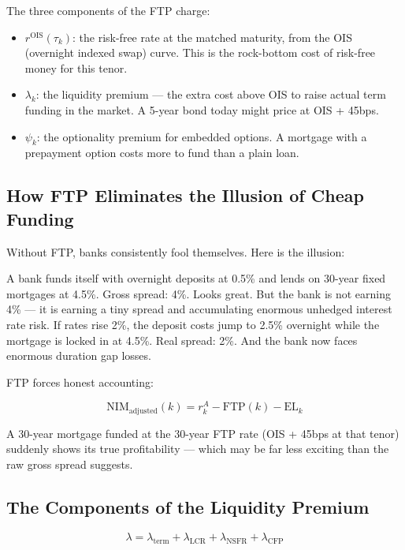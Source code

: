 \documentclass[12pt,a4paper]{article}
\begin{document}
The three components of the FTP charge:
\begin{itemize}[noitemsep]
  \item $r^{\text{OIS}}(\tau_k)$: the risk-free rate at the matched maturity,
        from the OIS (overnight indexed swap) curve.  This is the rock-bottom
        cost of risk-free money for this tenor.
  \item $\lambda_k$: the liquidity premium --- the extra cost above OIS to
        raise actual term funding in the market.  A 5-year bond today might
        price at OIS + 45bps.
  \item $\psi_k$: the optionality premium for embedded options.  A mortgage
        with a prepayment option costs more to fund than a plain loan.
\end{itemize}

\subsection{How FTP Eliminates the Illusion of Cheap Funding}

Without FTP, banks consistently fool themselves.  Here is the illusion:

A bank funds itself with overnight deposits at 0.5\% and lends on 30-year
fixed mortgages at 4.5\%.  Gross spread: 4\%.  Looks great.  But the bank
is not earning 4\% --- it is earning a tiny spread and accumulating enormous
unhedged interest rate risk.  If rates rise 2\%, the deposit costs jump to
2.5\% overnight while the mortgage is locked in at 4.5\%.  Real spread: 2\%.
And the bank now faces enormous duration gap losses.

FTP forces honest accounting:

\begin{equation}
  \text{NIM}_{\text{adjusted}}(k) = r_k^A - \text{FTP}(k) - \text{EL}_k
\end{equation}

A 30-year mortgage funded at the 30-year FTP rate (OIS + 45bps at that tenor)
suddenly shows its true profitability --- which may be far less exciting than
the raw gross spread suggests.

\subsection{The Components of the Liquidity Premium}

\begin{equation}
  \lambda = \lambda_{\text{term}} + \lambda_{\text{LCR}} + \lambda_{\text{NSFR}} + \lambda_{\text{CFP}}
\end{equation}
\end{document}
